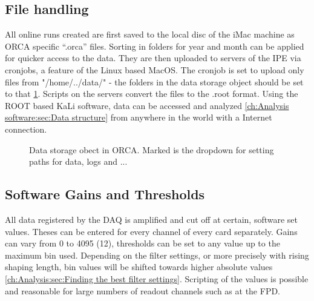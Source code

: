     \subsection{File handling}
    \label{ch:The muon detection system:sec:OrcaControl:subsec:FileHandling}
    All online runs created are first saved to the local disc of the iMac machine as ORCA specific ``.orca'' files. Sorting in folders for year and month can be applied for quicker access to the data. They are then uploaded to servers of the IPE via cronjobs, a feature of the Linux based MacOS. The cronjob is set to upload only files from "/home/../data/"  - the folders in the data storage object should be set to that \ref{fig:ORCA:dataStorage}. Scripts on the servers convert the files to the .root format. Using the ROOT based KaLi software, data can be accessed and analyzed \ref{ch:Analysis software:sec:Data structure} from anywhere in the world with a Internet connection. 
    
    \begin{figure}
    	\caption[ORCA data object]{Data storage obect in ORCA. Marked is the dropdown for setting paths for data, logs and ...}
    	\label{fig:ORCA:dataStorage}
    \end{figure}

    
    \subsection{Software Gains and Thresholds}
    \label{ch:The muon detection system:sec:OrcaControl:subsec:SoftwareGainsThresholds}
    All data registered by the DAQ is amplified and cut off at certain, software set values. Theses can be entered for every channel of every card separately. Gains can vary from \SI{0}{} to \SI{4095}{} (\SI{12}{\bit}), thresholds can be set to any value up to the maximum bin used. Depending on the filter settings, or more precisely with rising shaping length, bin values will be shifted towards higher absolute values \ref{ch:Analysis:sec:Finding the best filter settings}.
    Scripting of the values is possible and reasonable for large numbers of readout channels such as at the FPD.
   
